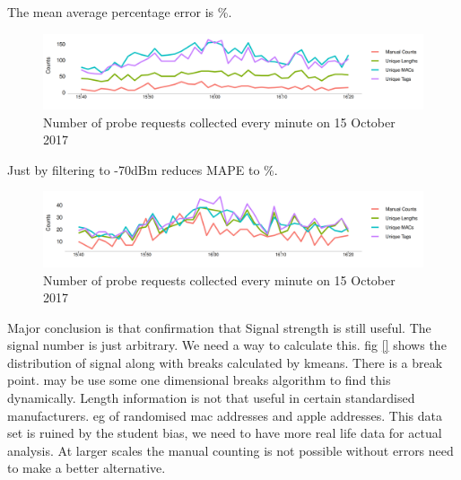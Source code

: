 The mean average percentage error is \%.

\begin{figure}
  \includegraphics{images/ucl-comparison-before.png}
  \caption{Number of probe requests collected every minute on 15 October 2017}
  \label{figure:collection:ucl:config}
\end{figure}

Just by filtering to -70dBm reduces MAPE to \%.

\begin{figure}
  \includegraphics{images/ucl-comparison-after.png}
  \caption{Number of probe requests collected every minute on 15 October 2017}
  \label{figure:collection:ucl:config}
\end{figure}


Major conclusion is that confirmation that Signal strength is still useful.
The signal number is just arbitrary. We need a way to calculate this.
fig \ref{} shows the distribution of signal along with breaks calculated by kmeans.
There is a break point. may be use some one dimensional breaks algorithm to find this dynamically.
Length information is not that useful in certain standardised manufacturers.
eg of randomised mac addresses and apple addresses.
This data set is ruined by the student bias, we need to have more real life data for actual analysis.
At larger scales the manual counting is not possible without errors need to make a better alternative.

